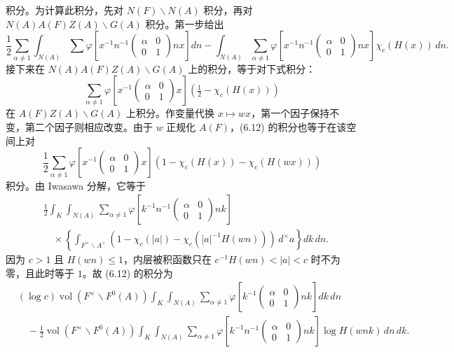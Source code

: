 积分。为计算此积分，先对 $N(F)\backslash N(A)$ 积分，再对
$N(A)A(F)Z(A)\backslash G(A)$ 积分。第一步给出
\[
 \frac12\sum_{\alpha\ne1}\int_{N(A)}\sum
 \varphi\!\left[x^{-1}n^{-1}\begin{pmatrix}\alpha&0\\0&1\end{pmatrix}nx\right]dn
 -\int_{N(A)}\sum_{\alpha\ne1}
 \varphi\!\left[x^{-1}n^{-1}\begin{pmatrix}\alpha&0\\0&1\end{pmatrix}nx\right]\chi_c(H(x))\,dn.
\]
接下来在 $N(A)A(F)Z(A)\backslash G(A)$ 上的积分，等于对下式积分：
\begin{equation}
 \sum_{\alpha\ne1}\varphi\!\left[x^{-1}\begin{pmatrix}\alpha&0\\0&1\end{pmatrix}x\right]
 \left(\tfrac12-\chi_c(H(x))\right)\tag{6.19}
\end{equation}
在 $A(F)Z(A)\backslash G(A)$ 上积分。作变量代换 $x\mapsto wx$，第一个因子保持不变，第二个因子则相应改变。由于
$w$ 正规化 $A(F)$，(6.12) 的积分也等于在该空间上对
\[
 \frac12\sum_{\alpha\ne1}\varphi\!\left[x^{-1}\begin{pmatrix}\alpha&0\\0&1\end{pmatrix}x\right]
 (1-\chi_c(H(x))-\chi_c(H(wx)))
\]
积分。由 Iwasawa 分解，它等于
\begin{equation}
\begin{split}
 &\frac12\int_K\int_{N(A)}\sum_{\alpha\ne1}
 \varphi\!\left[k^{-1}n^{-1}\begin{pmatrix}\alpha&0\\0&1\end{pmatrix}nk\right]\\
 &\quad\times\left\{\int_{F^\times\backslash A^\times}
 (1-\chi_c(|a|)-\chi_c(|a|^{-1}H(wn)))\,d^\times a\right\}dk\,dn.
\end{split}\tag{6.20}
\end{equation}
因为 $c>1$ 且 $H(wn)\le1$，内层被积函数只在 $c^{-1}H(wn)<|a|<c$ 时不为零，且此时等于
$1$。故 (6.12) 的积分为
\begin{equation}
\begin{split}
 &(\log c)\operatorname{vol}(F^\times\backslash F^0(A))
 \int_K\int_{N(A)}\sum_{\alpha\ne1}
 \varphi\!\left[k^{-1}\begin{pmatrix}\alpha&0\\0&1\end{pmatrix}nk\right]dk\,dn\\
 &\quad-\frac12\operatorname{vol}(F^\times\backslash F^0(A))
 \int_K\int_{N(A)}\sum_{\alpha\ne1}
 \varphi\!\left[k^{-1}n^{-1}\begin{pmatrix}\alpha&0\\0&1\end{pmatrix}nk\right]
 \log H(wnk)\,dn\,dk.
\end{split}\tag{6.21}
\end{equation}
